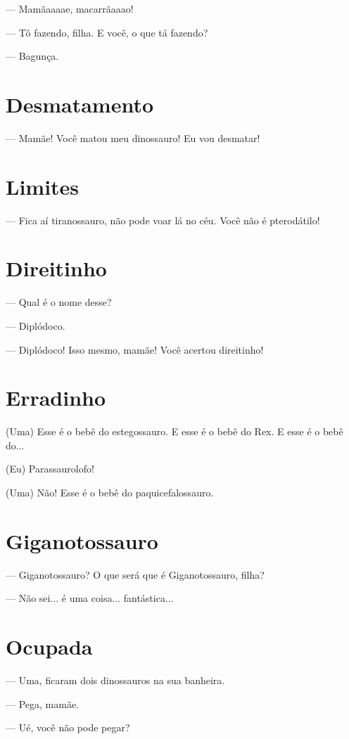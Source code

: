 — Mamãaaaae, macarrãaaao!

— Tô fazendo, filha. E você, o que tá fazendo?

— Bagunça.

\chapter{Desmatamento}

— Mamãe! Você matou meu dinossauro! Eu vou desmatar!

\chapter{Limites}

— Fica aí tiranossauro, não pode voar lá no céu. Você não é pterodátilo!

\chapter{Direitinho}

— Qual é o nome desse?

— Diplódoco.

— Diplódoco! Isso mesmo, mamãe! Você acertou direitinho!

\chapter{Erradinho}

(Uma) Esse é o bebê do estegossauro. E esse é o bebê do Rex. E esse é o
bebê do...

(Eu) Parassaurolofo!

(Uma) Não! Esse é o bebê do paquicefalossauro.

\chapter{Giganotossauro}

— Giganotossauro? O que será que é Giganotossauro, filha?

— Não sei... é uma coisa... fantástica...

\chapter{Ocupada}

— Uma, ficaram dois dinossauros na sua banheira.

— Pega, mamãe.

— Ué, você não pode pegar?

